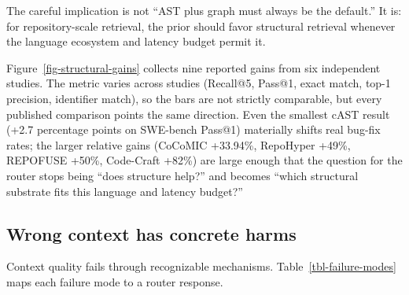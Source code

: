 \documentclass[
  11pt,
  letterpaper,
  numbers=noendperiod,
  parskip=half]{scrartcl}
\begin{document}
The careful implication is not ``AST plus graph must always be the
default.'' It is: for repository-scale retrieval, the prior should favor
structural retrieval whenever the language ecosystem and latency budget
permit it.

Figure~\ref{fig-structural-gains} collects nine reported gains from six
independent studies. The metric varies across studies (Recall@5, Pass@1,
exact match, top-1 precision, identifier match), so the bars are not
strictly comparable, but every published comparison points the same
direction. Even the smallest cAST result (+2.7 percentage points on
SWE-bench Pass@1) materially shifts real bug-fix rates; the larger
relative gains (CoCoMIC +33.94\%, RepoHyper +49\%, REPOFUSE +50\%,
Code-Craft +82\%) are large enough that the question for the router stops
being ``does structure help?'' and becomes ``which structural substrate
fits this language and latency budget?''

\figureStructuralRetrievalGains

\subsection{Wrong context has concrete harms}\label{sec-wrong-context}

Context quality fails through recognizable mechanisms.
Table~\ref{tbl-failure-modes} maps each failure mode to a router
response.
\end{document}
